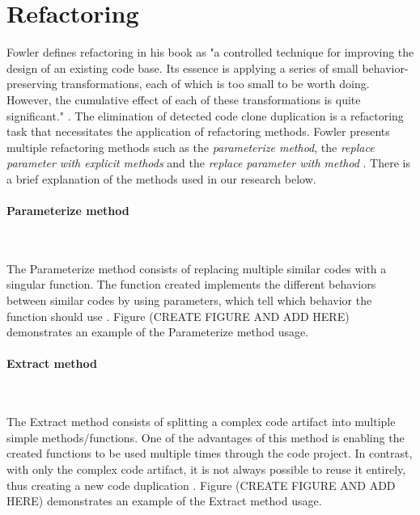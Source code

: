 \en

\section{Refactoring}

Fowler defines refactoring in his book as "a controlled technique for improving the design of an existing code base. 
Its essence is applying a series of small behavior-preserving transformations, each of which is too small to be worth 
doing. However, the cumulative effect of each of these transformations is quite significant." \citep{refactorbook}. 
The elimination of detected code clone duplication is a refactoring task that necessitates the 
application of refactoring methods. Fowler presents multiple refactoring methods such as the 
\textit{parameterize method}, the \textit{replace parameter with explicit methods} and 
the \textit{replace parameter with method} \citep{refactorbook}. 
There is a brief explanation of the methods used in our research below.

\paragraph{Parameterize method}

\

The Parameterize method consists of replacing multiple similar codes with a singular function. 
The function created implements the different behaviors between similar codes by using parameters, 
which tell which behavior the function should use \citep{refactorbook}.
Figure (CREATE FIGURE AND ADD HERE) demonstrates an example of the Parameterize method usage.

\paragraph{Extract method}

\

The Extract method consists of splitting a complex code artifact into multiple simple methods/functions. 
One of the advantages of this method is enabling the created functions to be used multiple times through 
the code project. In contrast, with only the complex code artifact, it is not always possible to reuse 
it entirely, thus creating a new code duplication \citep{refactorbook}. 
Figure (CREATE FIGURE AND ADD HERE) demonstrates an example of the Extract method usage.
